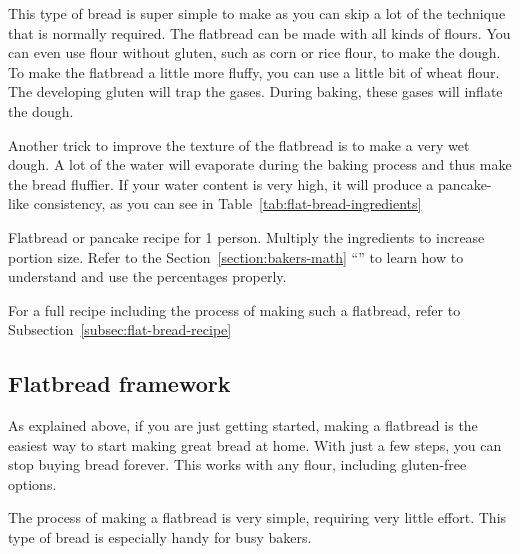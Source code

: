 This type of bread is super simple to make as you can skip
a lot of the technique that is normally required. The flatbread
can be made with all kinds of flours. You can even use
flour without gluten, such as corn or rice flour, to make the
dough. To make the flatbread a little more fluffy, you
can use a little bit of wheat flour. The developing gluten
will trap the gases. During baking, these gases will
inflate the dough.

Another trick to improve the texture of the flatbread is to
make a very wet dough. A lot of the water will evaporate
during the baking process and thus make the bread fluffier.
If your water content is very high, it will produce a
pancake-like consistency, as you can see in
Table~\ref{tab:flat-bread-ingredients}

\begin{table}[!htb]
    \begin{center}
        
        \caption[Flatbread recipe]{Flatbread or pancake recipe for 1 person.
            Multiply the ingredients to increase portion size.  Refer to the
            Section~\ref{section:bakers-math}
            ``'' to learn how to understand and
            use the percentages properly.}%
            \label{tab:flat-bread-ingredients}
    \end{center}
\end{table}

For a full recipe including the process of making such a flatbread,   refer to
Subsection~\ref{subsec:flat-bread-recipe}

\subsection{Flatbread framework}%
\label{subsec:flat-bread-framework}

As explained above, if you are just getting started, making a flatbread is the
easiest way to start making great bread at home. With just a
few steps, you can stop buying bread forever. This works with
any flour, including gluten-free options.

\begin{flowchart}[!htb]
\begin{center}
  
  \caption[The process to make a sourdough flatbread]{The process of making a flatbread is very
      simple, requiring very little effort. This type of bread is especially
      handy for busy bakers.}%
  \label{fig:flat-bread-process}
\end{center}
\end{flowchart}

